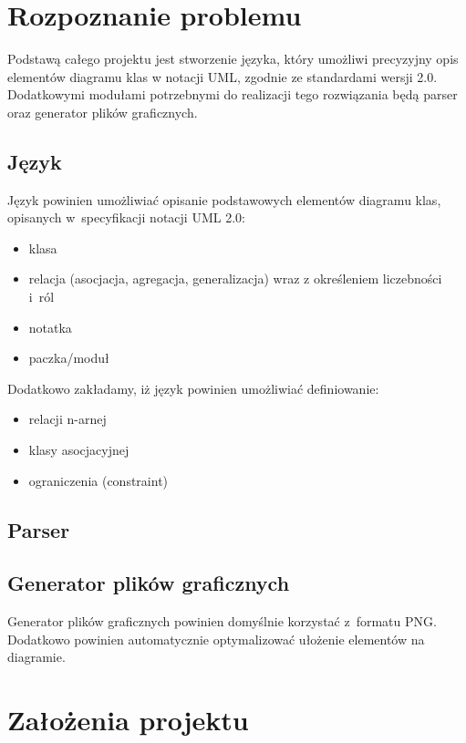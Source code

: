 \documentclass[a4paper, 11pt]{report}
\begin{document}
\section{Rozpoznanie problemu}
Podstawą całego projektu jest stworzenie języka, który umożliwi precyzyjny opis elementów diagramu
klas w notacji UML, zgodnie ze standardami wersji 2.0.
Dodatkowymi modułami potrzebnymi do realizacji tego rozwiązania będą parser oraz generator plików
graficznych.

\subsection{Język}
Język powinien umożliwiać opisanie podstawowych elementów diagramu klas, opisanych w~specyfikacji
notacji UML 2.0:
\begin{itemize}
\item{klasa}
\item{relacja (asocjacja, agregacja, generalizacja) wraz z określeniem liczebności i~ról}
\item{notatka}
\item{paczka/moduł}
\end{itemize}
Dodatkowo zakładamy, iż język powinien umożliwiać definiowanie:
\begin{itemize}
\item{relacji n-arnej}
\item{klasy asocjacyjnej}
\item{ograniczenia (constraint)}
\end{itemize}

\subsection{Parser}

\subsection{Generator plików graficznych}
Generator plików graficznych powinien domyślnie korzystać z~formatu PNG. Dodatkowo powinien
automatycznie optymalizować ułożenie elementów na diagramie. 

\section{Założenia projektu}
\end{document}
